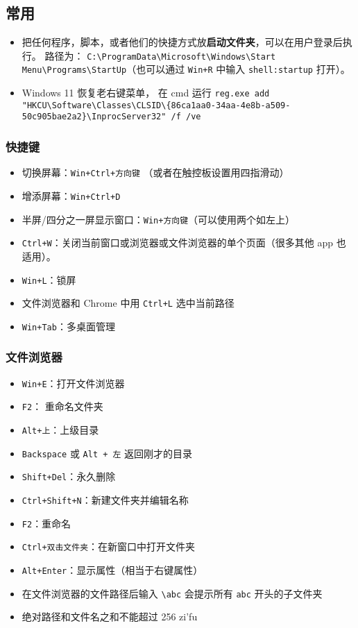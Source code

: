 
\subsection{常用}
\begin{itemize}
\item 把任何程序，脚本，或者他们的快捷方式放\textbf{启动文件夹}，可以在用户登录后执行。 路径为： \verb|C:\ProgramData\Microsoft\Windows\Start Menu\Programs\StartUp|（也可以通过 \verb|Win+R| 中输入 \verb|shell:startup| 打开）。
\item Windows 11 恢复老右键菜单， 在 cmd 运行 \verb`reg.exe add "HKCU\Software\Classes\CLSID\{86ca1aa0-34aa-4e8b-a509-50c905bae2a2}\InprocServer32" /f /ve`
\end{itemize}

\subsubsection{快捷键}
\begin{itemize}
\item 切换屏幕：\verb|Win+Ctrl+方向键| （或者在触控板设置用四指滑动）
\item 增添屏幕：\verb|Win+Ctrl+D|
\item 半屏/四分之一屏显示窗口：\verb|Win+方向键|（可以使用两个如左上）
\item \verb|Ctrl+W|：关闭当前窗口或浏览器或文件浏览器的单个页面（很多其他 app 也适用）。
\item \verb|Win+L|：锁屏
\item 文件浏览器和 Chrome 中用 \verb|Ctrl+L| 选中当前路径
\item \verb|Win+Tab|：多桌面管理
\end{itemize}

\subsubsection{文件浏览器}
\begin{itemize}
\item \verb|Win+E|：打开文件浏览器
\item \verb`F2`： 重命名文件夹
\item \verb|Alt+上|：上级目录
\item \verb|Backspace| 或 \verb|Alt + 左| 返回刚才的目录
\item \verb|Shift+Del|：永久删除
\item \verb|Ctrl+Shift+N|：新建文件夹并编辑名称
\item \verb|F2|：重命名
\item \verb|Ctrl+双击文件夹|：在新窗口中打开文件夹
\item \verb`Alt+Enter`：显示属性（相当于右键属性）
\item 在文件浏览器的文件路径后输入 \verb`\abc` 会提示所有 \verb`abc` 开头的子文件夹
\item 绝对路径和文件名之和不能超过 256 zi'fu
\end{itemize}


